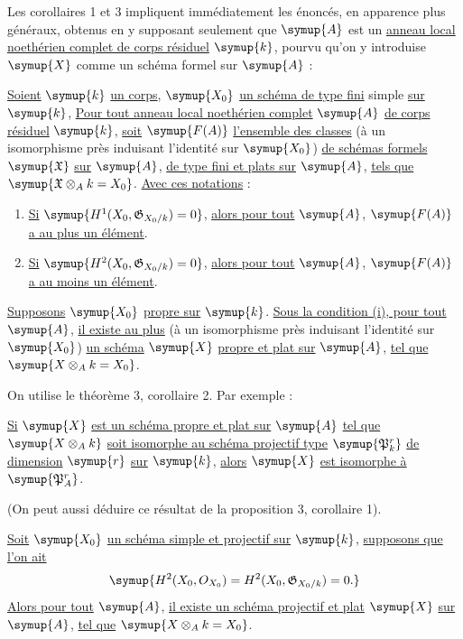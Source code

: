 Les corollaires 1 et 3 impliquent immédiatement les énoncés, en apparence plus
généraux, obtenus en y supposant seulement que $\symup{A}$ est un \uline{anneau local noethérien complet de corps résiduel} $\symup{k}$, pourvu qu'on y introduise $\symup{X}$ comme
un schéma formel sur $\symup{A}$ :

 \uline{Soient} $\symup{k}$ \uline{un corps}, $\symup{X_0}$ \uline{un schéma de type fini} simple
\uline{sur} $\symup{k}$, \uline{Pour tout anneau local noethérien complet} $\symup{A}$ \uline{de corps résiduel} $\symup{k}$,
\uline{soit} $\symup{F(A)}$ \uline{l'ensemble des classes} (à un isomorphisme près induisant l'identité
sur $\symup{X_0}$)
\uline{de schémas formels} $\symup{\mathfrak X}$ \uline{sur} $\symup{A}$, \uline{de type fini et plats sur}
$\symup{A}$, \uline{tels que} $\symup{\mathfrak X\otimes_A k=X_0}$. \uline{Avec ces notations} :
\begin{enumerate}
  \item[\textnormal{i.}] \uline{Si} $\symup{H^1(X_0,\mathfrak G_{X_0/k})=0}$, \uline{alors pour tout} $\symup{A}$,
    $\symup{F(A)}$ \uline{a au plus un élément}.
  \item[\textnormal{ii.}] \uline{Si} $\symup{H^2(X_0,\mathfrak G_{X_0/k})=0}$, \uline{alors pour tout} $\symup{A}$,
    $\symup{F(A)}$ \uline{a au moins un élément}.
\end{enumerate}

 \uline{Supposons} $\symup{X_0}$ \uline{propre sur} $\symup{k}$. \uline{Sous la condition
(i), pour tout} $\symup{A}$, \uline{il existe au plus} (à un isomorphisme près
induisant l'identité sur $\symup{X_0}$) \uline{un schéma} $\symup{X}$ \uline{propre et plat sur} $\symup{A}$, \uline{tel que}
$\symup{X\otimes_A k=X_0}$.

On utilise le théorème 3, corollaire 2. Par exemple :

 \uline{Si} $\symup{X}$ \uline{est un schéma propre et plat sur} $\symup{A}$ \uline{tel que}
$\symup{X\otimes_A k}$ \uline{soit isomorphe au schéma projectif type} $\symup{\mathfrak P_k^r}$ \uline{de
dimension} $\symup{r}$ \uline{sur} $\symup{k}$, \uline{alors} $\symup{X}$ \uline{est isomorphe à} $\symup{\mathfrak P_A^r}$.

(On peut aussi déduire ce résultat de la proposition 3, corollaire 1).

 \uline{Soit} $\symup{X_0}$ \uline{un schéma simple et projectif sur} $\symup{k}$,
\uline{supposons que l'on ait}
\[
  \symup{H^2(X_0,O_{X_0})=H^2(X_0,\mathfrak G_{X_0/k})=0.}
\]
\uline{Alors pour tout} $\symup{A}$, \uline{il existe un schéma projectif et plat} $\symup{X}$ \uline{sur} $\symup{A}$, \uline{tel que}
$\symup{X\otimes_A k=X_0}$.

